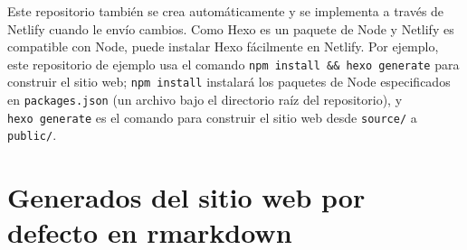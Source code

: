 \documentclass[12pt,]{krantz}
\makeatletter
\newenvironment{Shaded}{\begin{snugshade}}{\end{snugshade}}
\newcommand{\CommentTok}[1]{\textcolor[rgb]{0.56,0.35,0.01}{\textit{#1}}}
\newcommand{\DataTypeTok}[1]{\textcolor[rgb]{0.13,0.29,0.53}{#1}}
\newcommand{\DecValTok}[1]{\textcolor[rgb]{0.00,0.00,0.81}{#1}}
\newcommand{\KeywordTok}[1]{\textcolor[rgb]{0.13,0.29,0.53}{\textbf{#1}}}
\newcommand{\NormalTok}[1]{#1}
\newcommand{\OperatorTok}[1]{\textcolor[rgb]{0.81,0.36,0.00}{\textbf{#1}}}
\newcommand{\OtherTok}[1]{\textcolor[rgb]{0.56,0.35,0.01}{#1}}
\newcommand{\StringTok}[1]{\textcolor[rgb]{0.31,0.60,0.02}{#1}}
\newenvironment{kframe}{%
\medskip{}
\setlength{\fboxsep}{.8em}
 \def\at@end@of@kframe{}%
 \ifinner\ifhmode%
  \def\at@end@of@kframe{\end{minipage}}%
  \begin{minipage}{\columnwidth}%
 \fi\fi%
 \def\FrameCommand##1{\hskip\@totalleftmargin \hskip-\fboxsep
 \colorbox{shadecolor}{##1}\hskip-\fboxsep
     \hskip-\linewidth \hskip-\@totalleftmargin \hskip\columnwidth}%
 \MakeFramed {\advance\hsize-\width
   \@totalleftmargin\z@ \linewidth\hsize
   \@setminipage}}%
 {\par\unskip\endMakeFramed%
 \at@end@of@kframe}
\renewenvironment{Shaded}{\begin{kframe}}{\end{kframe}}
\theoremstyle{definition}
\theoremstyle{definition}
\theoremstyle{definition}
\theoremstyle{remark}
\makeatother
\begin{document}
\begin{Shaded}
\end{Shaded}

Este repositorio también se crea automáticamente y se implementa a
través de Netlify cuando le envío cambios. Como Hexo es
un paquete de Node y Netlify es compatible con Node, puede instalar Hexo
fácilmente en Netlify. Por ejemplo, este repositorio de ejemplo usa el
comando \texttt{npm\ install\ \&\&\ hexo\ generate} para construir el
sitio web; \texttt{npm\ install} instalará los paquetes de Node
especificados en \texttt{packages.json} (un archivo bajo el directorio
raíz del repositorio), y \texttt{hexo\ generate} es el comando para
construir el sitio web desde \texttt{source/} a \texttt{public/}.

\hypertarget{rmd-website}{%
\section{Generados del sitio web por defecto en
rmarkdown}\label{rmd-website}}
\end{document}
